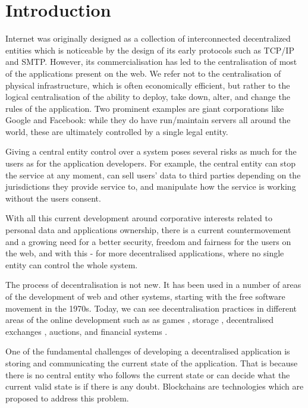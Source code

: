 \section{Introduction}\label{sec:intro}
Internet was originally designed as a collection of interconnected decentralized entities which is noticeable by the design of its early protocols such as TCP/IP and SMTP. However, its commercialisation has led to the centralisation of most of the applications present on the web. We refer not to the centralisation of physical infrastructure, which is often economically efficient, but rather to the logical centralisation of the ability to deploy, take down, alter, and change the rules of the application. Two prominent examples are giant corporations like Google and Facebook: while they do have run/maintain servers all around the world, these are ultimately controlled by a single legal entity.

Giving a central entity control over a system poses several risks as much for the users as for the application developers. For example, the central entity can stop the service at any moment, can sell users' data to third parties depending on the jurisdictions they provide service to, and manipulate how the service is working without the users consent.

With all this current development around corporative interests related to personal data and applications ownership, there is a current countermovement and a growing need for a better security, freedom and fairness for the users on the web, and with this - for more decentralised applications, where no single entity can control the whole system.
    
The process of decentralisation is not new. It has been used in a number of areas of the development of web and other systems, starting with the free software movement in the 1970s. Today, we can see decentralisation practices in different areas of the online development such as as games \cite{}, storage \cite{}, decentralised exchanges \cite{}, auctions\cite{}, and financial systems \cite{}.

One of the fundamental challenges of developing a decentralised application is storing and communicating the current state of the application. That is because there is no central entity who follows the current state or can decide what the current valid state is if there is any doubt. Blockchains are technologies which are proposed to address this problem.


